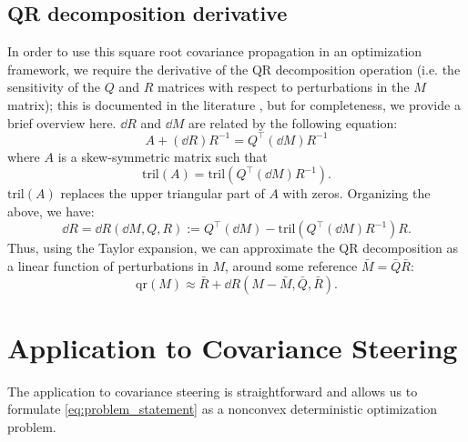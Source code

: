 \documentclass{IEEEtran}
\begin{document}
\subsection{QR decomposition derivative}
In order to use this square root covariance propagation in an optimization framework, we require the derivative of the QR decomposition operation (i.e. the sensitivity of the $Q$ and $R$ matrices with respect to perturbations in the $M$ matrix); this is documented in the literature \cite{deleeuwDifferentiatingQRDecomposition2023}, but for completeness, we provide a brief overview here. $\dd R$ and $\dd M$ are related by the following equation:
\begin{equation}
	A + (\dd R) R^{-1} = Q^\top (\dd M) R^{-1}
\end{equation}
where \( A \) is a skew-symmetric matrix such that 
\begin{equation}
	\mathrm{tril}(A) = \mathrm{tril}(Q^\top (\dd M) R^{-1}).
\end{equation}
\( \mathrm{tril}(A) \) replaces the upper triangular part of \( A \) with zeros.
Organizing the above, we have:
\begin{equation}
	\dd R = \dd R(\dd M, Q, R) := Q^\top (\dd M) - \mathrm{tril}(Q^\top (\dd M) R^{-1}) R.
\end{equation}
Thus, using the Taylor expansion, we can approximate the QR decomposition as a linear function of perturbations in \( M \), around some reference \( \bar{M} = \bar{Q} \bar{R} \):
\begin{equation}
	\mathrm{qr}(M) \approx \bar{R} + \dd R(M - \bar{M}, \bar{Q}, \bar{R}).
\end{equation}

\section{Application to Covariance Steering}
The application to covariance steering is straightforward and allows us to formulate \cref{eq:problem_statement} as a nonconvex deterministic optimization problem.
\end{document}

